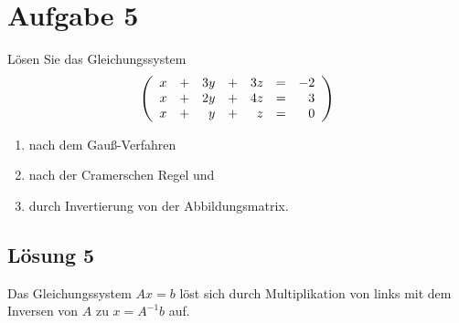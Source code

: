 \documentclass[main.tex]{subfiles}
\begin{document}
\section{Aufgabe 5}
Lösen Sie das Gleichungssystem
$$
    \eqmatrix{rcrcrcr}{
        x & + & 3y & + & 3z & = & -2 \\
        x & + & 2y & + & 4z & = &  3 \\
        x & + &  y & + &  z & = &  0 \\
    }
$$
\begin{enumerate}
    \item nach dem Gauß-Verfahren
    \item nach der Cramerschen Regel und
    \item durch Invertierung von der Abbildungsmatrix.
\end{enumerate}

\subsection{Lösung 5}
Das Gleichungssystem $Ax=b$ löst sich durch Multiplikation von links mit dem Inversen von $A$ zu $x=A^{-1}b$ auf.
\end{document}

